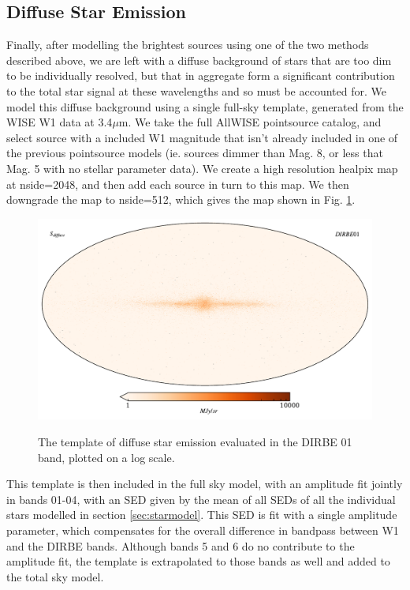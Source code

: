 \documentclass{aa}
\begin{document}
\subsection{Diffuse Star Emission}

\label{sec:diffusemodel}

Finally, after modelling the brightest sources using one of the two methods described above, we are left with a diffuse background of stars that are too dim to be individually resolved, but that in aggregate form a significant contribution to the total star signal at these wavelengths and so must be accounted for. We model this diffuse background using a single full-sky template, generated from the WISE W1 data at 3.4$\mu$m. We take the full AllWISE pointsource catalog, and select source with a included W1 magnitude that isn't already included in one of the previous pointsource models (ie. sources dimmer than Mag. 8, or less that Mag. 5 with no stellar parameter data). We create a high resolution healpix map \citep{healpix} at nside=2048, and then add each source in turn to this map. We then downgrade the map to nside=512, which gives the map shown in Fig. \ref{fig:diffuse}. 

\begin{figure}
  \centering
  \includegraphics[width=\columnwidth]{figs/diffuseTemplate/diffuse_stars_log.pdf}\\
  \caption{The template of diffuse star emission evaluated in the DIRBE 01 band, plotted on a log scale.}
  \label{fig:diffuse}
\end{figure}

This template is then included in the full sky model, with an amplitude fit jointly in bands 01-04, with an SED given by the mean of all SEDs of all the individual stars modelled in section \ref{sec:starmodel}. This SED is fit with a single amplitude parameter, which compensates for the overall difference in bandpass between W1 and the DIRBE bands. Although bands 5 and 6 do no contribute to the amplitude fit, the template is extrapolated to those bands as well and added to the total sky model.
\end{document}

